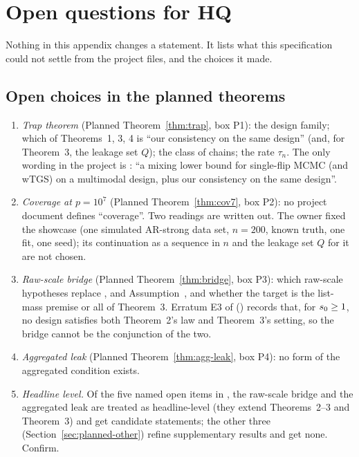 \section{Open questions for HQ}\label{app:hq}

Nothing in this appendix changes a statement. It lists what this specification could not settle from the project files,
and the choices it made.

\subsection{Open choices in the planned theorems}

\begin{enumerate}[label=\textbf{H\arabic*.},leftmargin=2.6em,itemsep=2pt]
  \item \emph{Trap theorem} (Planned Theorem~\ref{thm:trap}, box P1): the design family; which of Theorems~1, 3, 4 is
    ``our consistency on the same design'' (and, for Theorem~3, the leakage set $Q$); the class of chains; the rate
    $\tau_n$. The only wording in the project is : ``a mixing lower bound for
    single-flip MCMC (and wTGS) on a multimodal design, plus our consistency on the same design''.
  \item \emph{Coverage at $p=10^7$} (Planned Theorem~\ref{thm:cov7}, box P2): no project document defines ``coverage''.
    Two readings are written out. The owner fixed the showcase (one simulated AR-strong data set, $n=200$, known truth,
    one fit, one seed); its continuation as a sequence in $n$ and the leakage set $Q$ for it are not chosen.
  \item \emph{Raw-scale bridge} (Planned Theorem~\ref{thm:bridge}, box P3): which raw-scale hypotheses replace ,
     and Assumption~, and whether the target is the list-mass premise or all of Theorem~3. Erratum E3
    of  () records that, for $s_0\ge1$, no design satisfies both Theorem~2's law and
    Theorem~3's setting, so the bridge cannot be the conjunction of the two.
  \item \emph{Aggregated leak} (Planned Theorem~\ref{thm:agg-leak}, box P4): no form of the aggregated condition exists.
  \item \emph{Headline level.} Of the five named open items in , the raw-scale bridge and
    the aggregated leak are treated as headline-level (they extend Theorems~2--3 and Theorem~3) and get candidate
    statements; the other three (Section~\ref{sec:planned-other}) refine supplementary results and get none. Confirm.
\end{enumerate}


